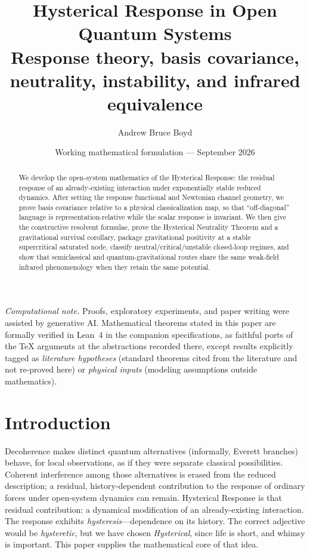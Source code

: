 \documentclass[11pt]{article}
\title{\textbf{Hysterical Response in Open Quantum Systems}\\[0.45em]
\large Response theory, basis covariance, neutrality, instability, and infrared equivalence}
\author{Andrew Bruce Boyd}
\date{Working mathematical formulation --- September 2026}
\theoremstyle{definition}
\theoremstyle{remark}
\begin{document}
\maketitle
\noindent\textit{Computational note.}
Proofs, exploratory experiments, and paper writing were assisted by generative AI.
Mathematical theorems stated in this paper are formally verified in Lean~4 in the companion specifications, as faithful ports of the TeX arguments at the abstractions recorded there, except results explicitly tagged as \emph{literature hypotheses} (standard theorems cited from the literature and not re-proved here) or \emph{physical inputs} (modeling assumptions outside mathematics).

\begin{abstract}
We develop the open-system mathematics of the Hysterical Response: the residual response of an already-existing interaction under exponentially stable reduced dynamics.
After setting the response functional and Newtonian channel geometry, we prove basis covariance relative to a physical classicalization map, so that ``off-diagonal'' language is representation-relative while the scalar response is invariant.
We then give the constructive resolvent formulae, prove the Hysterical Neutrality Theorem and a gravitational survival corollary, package gravitational positivity at a stable supercritical saturated node, classify neutral/critical/unstable closed-loop regimes, and show that semiclassical and quantum-gravitational routes share the same weak-field infrared phenomenology when they retain the same potential.
\end{abstract}
\tableofcontents
\newpage

\section{Introduction}
Decoherence makes distinct quantum alternatives (informally, Everett branches) behave, for local observations, as if they were separate classical possibilities.
Coherent interference among those alternatives is erased from the reduced description; a residual, history-dependent contribution to the response of ordinary forces under open-system dynamics can remain.
Hysterical Response is that residual contribution: a dynamical modification of an already-existing interaction.
The response exhibits \emph{hysteresis}---dependence on its history.
The correct adjective would be \emph{hysteretic}, but we have chosen \emph{Hysterical}, since life is short, and whimsy is important.
This paper supplies the mathematical core of that idea.
\end{document}
